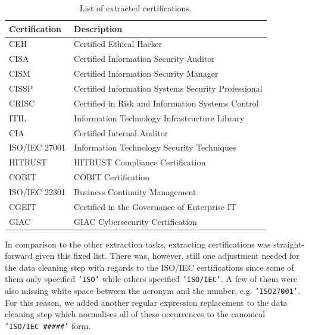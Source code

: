 \documentclass[runningheads]{llncs}
\begin{document}
\begin{table}[ht]
	\centering
  \caption{List of extracted certifications.}
  \label{tab:certifications}

  \begin{tabular}{|l|l|}
    \hline
    \textbf{Certification} & \textbf{Description}                                \\ \hline
    CEH                    & Certified Ethical Hacker                            \\ \hline
    CISA                   & Certified Information Security Auditor              \\ \hline
    CISM                   & Certified Information Security Manager              \\ \hline
    CISSP                  & Certified Information Systems Security Professional \\ \hline
    CRISC                  & Certified in Risk and Information Systems Control   \\ \hline
    ITIL                   & Information Technology Infrastructure Library       \\ \hline
    CIA                    & Certified Internal Auditor                          \\ \hline
    ISO/IEC 27001          & Information Technology Security Techniques          \\ \hline
    HITRUST                & HITRUST Compliance Certification                    \\ \hline
    COBIT                  & COBIT Certification                                 \\ \hline
    ISO/IEC 22301          & Business Continuity Management                      \\ \hline
    CGEIT                  & Certified in the Governance of Enterprise IT        \\ \hline
    GIAC                   & GIAC Cybersecurity Certification                    \\ \hline
  \end{tabular}
\end{table}

In comparison to the other extraction tasks, extracting certifications was straight-forward given this fixed list. There was, however, still one adjustment needed for the data cleaning step with regards to the ISO/IEC certifications since some of them only specified \texttt{'ISO'} while others specified \texttt{'ISO/IEC'}. A few of them were also missing white space between the acronym and the number, e.g. \texttt{'ISO27001'}. For this reason, we added another regular expression replacement to the data cleaning step which normalises all of these occurrences to the canonical \texttt{'ISO/IEC~\#\#\#\#\#'} form.
\end{document}
